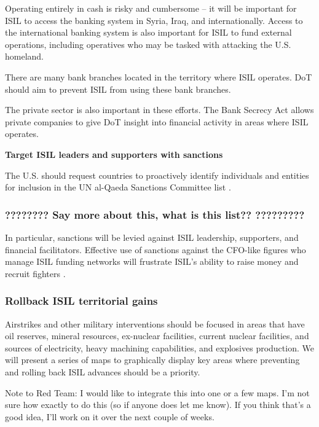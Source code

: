 \documentclass{report}
\begin{document}
Operating entirely in cash is risky and cumbersome – it will be important for ISIL to access the banking system in Syria, Iraq, and internationally. Access to the international banking system is also important for ISIL to fund external operations, including operatives who may be tasked with attacking the U.S. homeland. 

There are many bank branches located in the territory where ISIL operates. DoT should aim to prevent ISIL from using these bank branches. 

The private sector is also important in these efforts. The Bank Secrecy Act allows private companies to give DoT insight into financial activity in areas where ISIL operates. 

\textbf{Target ISIL leaders and supporters with sanctions}

The U.S. should request countries to proactively identify individuals and entities for inclusion in the UN al-Qaeda Sanctions Committee list \cite{Report2015}.

 \subsubsection{???????? Say more about this, what is this list??   ?????????}

In particular, sanctions will be levied against ISIL leadership, supporters, and financial facilitators. Effective use of sanctions against the CFO-like figures who manage ISIL funding networks will frustrate ISIL's ability to raise money and recruit fighters \cite{Cohen2014}.

\subsubsection{Rollback ISIL territorial gains}

Airstrikes and other military interventions should be focused in areas that have oil reserves, mineral resources, ex-nuclear facilities, current nuclear facilities, and sources of electricity, heavy machining capabilities, and explosives production. We will present a series of maps to graphically display key areas where preventing and rolling back ISIL advances should be a priority.

Note to Red Team: I would like to integrate this into one or a few maps. I'm not sure how exactly to do this (so if anyone does let me know). If you think that's a good idea, I'll work on it over the next couple of weeks.
\end{document}
